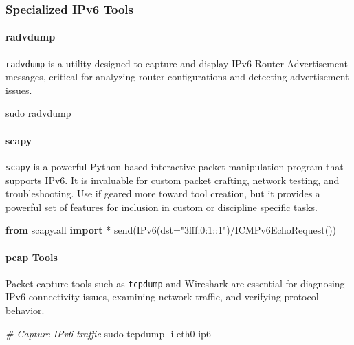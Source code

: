 \documentclass[
]{article}
\newenvironment{Shaded}{}{}
\newcommand{\AttributeTok}[1]{\textcolor[rgb]{0.49,0.56,0.16}{#1}}
\newcommand{\BuiltInTok}[1]{\textcolor[rgb]{0.00,0.50,0.00}{#1}}
\newcommand{\CommentTok}[1]{\textcolor[rgb]{0.38,0.63,0.69}{\textit{#1}}}
\newcommand{\FunctionTok}[1]{\textcolor[rgb]{0.02,0.16,0.49}{#1}}
\newcommand{\ImportTok}[1]{\textcolor[rgb]{0.00,0.50,0.00}{\textbf{#1}}}
\newcommand{\NormalTok}[1]{#1}
\newcommand{\OperatorTok}[1]{\textcolor[rgb]{0.40,0.40,0.40}{#1}}
\newcommand{\StringTok}[1]{\textcolor[rgb]{0.25,0.44,0.63}{#1}}
\begin{document}
\subsubsection{Specialized IPv6 Tools}\label{specialized-ipv6-tools}

\paragraph{radvdump}\label{radvdump}

\texttt{radvdump} is a utility designed to capture and display IPv6
Router Advertisement messages, critical for analyzing router
configurations and detecting advertisement issues.

\begin{Shaded}
\begin{Highlighting}[]
\FunctionTok{sudo}\NormalTok{ radvdump}
\end{Highlighting}
\end{Shaded}

\paragraph{scapy}\label{scapy}

\texttt{scapy} is a powerful Python-based interactive packet
manipulation program that supports IPv6. It is invaluable for custom
packet crafting, network testing, and troubleshooting. Use if geared
more toward tool creation, but it provides a powerful set of features
for inclusion in custom or discipline specific tasks.

\begin{Shaded}
\begin{Highlighting}[]
\ImportTok{from}\NormalTok{ scapy.}\BuiltInTok{all} \ImportTok{import} \OperatorTok{*}
\NormalTok{send(IPv6(dst}\OperatorTok{=}\StringTok{"3fff:0:1::1"}\NormalTok{)}\OperatorTok{/}\NormalTok{ICMPv6EchoRequest())}
\end{Highlighting}
\end{Shaded}

\paragraph{pcap Tools}\label{pcap-tools}

Packet capture tools such as \texttt{tcpdump} and Wireshark are
essential for diagnosing IPv6 connectivity issues, examining network
traffic, and verifying protocol behavior.

\begin{Shaded}
\begin{Highlighting}[]
\CommentTok{\# Capture IPv6 traffic}
\FunctionTok{sudo}\NormalTok{ tcpdump }\AttributeTok{{-}i}\NormalTok{ eth0 ip6}
\end{Highlighting}
\end{Shaded}
\end{document}
